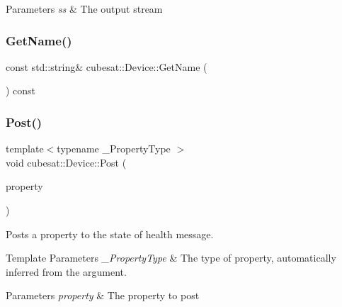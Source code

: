 \begin{DoxyParams}{Parameters}
{\em ss} & The output stream \\
\hline
\end{DoxyParams}
\mbox{\label{classcubesat_1_1Device_a599328b0664f0ea2099e3ca1de79779f}} 
\subsubsection{\texorpdfstring{Get\+Name()}{GetName()}}
{\footnotesize\ttfamily const std\+::string\& cubesat\+::\+Device\+::\+Get\+Name (\begin{DoxyParamCaption}{ }\end{DoxyParamCaption}) const\hspace{0.3cm}{\ttfamily [inline]}}

\mbox{\label{classcubesat_1_1Device_a307f4f199eb01b10e44e3b6a42034349}} 
\subsubsection{\texorpdfstring{Post()}{Post()}}
{\footnotesize\ttfamily template$<$typename \+\_\+\+Property\+Type $>$ \\
void cubesat\+::\+Device\+::\+Post (\begin{DoxyParamCaption}\item[{const \+\_\+\+Property\+Type \&}]{property }\end{DoxyParamCaption})\hspace{0.3cm}{\ttfamily [inline]}}



Posts a property to the state of health message. 


\begin{DoxyTemplParams}{Template Parameters}
{\em \+\_\+\+Property\+Type} & The type of property, automatically inferred from the argument. \\
\hline
\end{DoxyTemplParams}

\begin{DoxyParams}{Parameters}
{\em property} & The property to post \\
\hline
\end{DoxyParams}
\mbox{\label{classcubesat_1_1Device_a586d450c984461a04503e895758cafcb}} 
